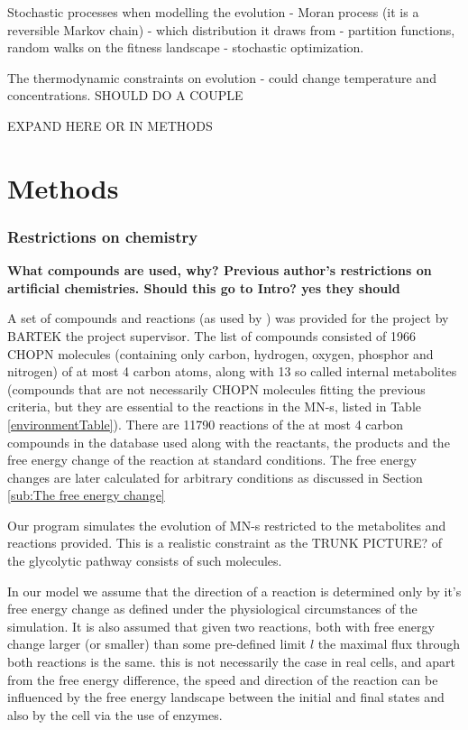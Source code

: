 \documentclass[10pt,a4paper]{article}
\begin{document}
	Stochastic processes when modelling the evolution - Moran process  (it is a reversible Markov chain) - which distribution it draws from - partition functions, random walks on the fitness landscape - stochastic optimization. 


	The thermodynamic constraints on evolution - could change temperature and concentrations.  SHOULD DO A COUPLE
	
	EXPAND HERE OR IN METHODS


	
\section{Methods}
\label{sec:methods}

\subsubsection{Restrictions on chemistry}
\label{ssub:Restrictions on chemistry}
\textbf{
What compounds are used, why?
Previous author's restrictions on artificial chemistries. Should this go to Intro? yes they should }

	A set of compounds and reactions (as used by \cite[]{BartekLower}) was provided for the project by BARTEK the project supervisor. The list of compounds consisted of 1966 CHOPN molecules (containing only carbon, hydrogen, oxygen, phosphor and nitrogen) of at most 4 carbon atoms, along with 13 so called internal metabolites (compounds that are not necessarily CHOPN molecules fitting the previous criteria, but they are essential to the reactions in the MN-s, listed in Table \ref{environmentTable}). 	There are 11790 reactions of the at most 4 carbon compounds in the database used along with the reactants, the products and the free energy change of the reaction at standard conditions. The free energy changes are later calculated for arbitrary conditions as discussed in Section \ref{sub:The free energy change}

	Our program simulates the evolution of MN-s restricted to the metabolites and reactions provided. This is a realistic constraint as the TRUNK PICTURE? of the glycolytic pathway consists of such molecules.

	In our model we assume that the direction of a reaction is determined only by it's free energy change as defined under the physiological circumstances of the simulation. It is also assumed that given two reactions, both with free energy change larger (or smaller) than some pre-defined limit $l$ the maximal flux through both reactions is the same. this is not necessarily the case in real cells, and apart from the free energy difference, the speed and direction of the reaction can be influenced by the free energy landscape between the initial and final states and also by the cell via the use of enzymes. 
\end{document}

